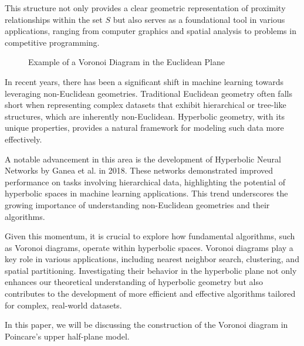 \documentclass[minted, draw]{hebdomon}
\begin{document}
This structure not only provides a clear geometric representation of proximity relationships within the set \( S \) but also serves as a foundational tool in various applications, ranging from computer graphics and spatial analysis to problems in competitive programming. 

\begin{figure}
	\centering
        \caption{Example of a Voronoi Diagram in the Euclidean Plane}
        \label{fig:voronoi}
\end{figure}
%

In recent years, there has been a significant shift in machine learning towards leveraging non-Euclidean geometries. Traditional Euclidean geometry often falls short when representing complex datasets that exhibit hierarchical or tree-like structures, which are inherently non-Euclidean. Hyperbolic geometry, with its unique properties, provides a natural framework for modeling such data more effectively.

A notable advancement in this area is the development of Hyperbolic Neural Networks by Ganea et al. in 2018. These networks demonstrated improved performance on tasks involving hierarchical data, highlighting the potential of hyperbolic spaces in machine learning applications. This trend underscores the growing importance of understanding non-Euclidean geometries and their algorithms.

Given this momentum, it is crucial to explore how fundamental algorithms, such as Voronoi diagrams, operate within hyperbolic spaces. Voronoi diagrams play a key role in various applications, including nearest neighbor search, clustering, and spatial partitioning. Investigating their behavior in the hyperbolic plane not only enhances our theoretical understanding of hyperbolic geometry but also contributes to the development of more efficient and effective algorithms tailored for complex, real-world datasets.


%

In this paper, we will be discussing the construction of the Voronoi diagram in Poincare's upper half-plane model.







\end{document}
